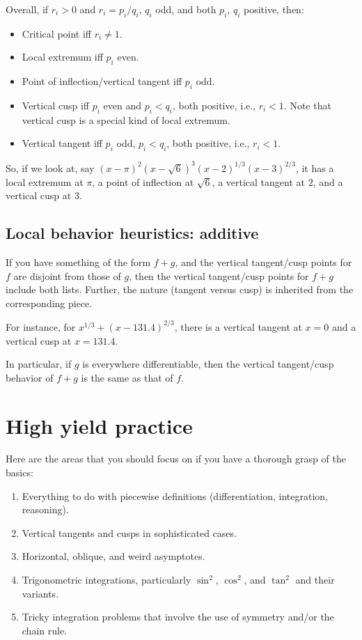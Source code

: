 \documentclass[10pt]{amsart}
\begin{document}
Overall, if $r_i > 0$ and $r_i = p_i/q_i$, $q_i$ odd, and both $p_i$,
$q_i$ positive, then:

\begin{itemize}
\item Critical point iff $r_i \ne 1$.
\item Local extremum iff $p_i$ even.
\item Point of inflection/vertical tangent iff $p_i$ odd.
\item Vertical cusp iff $p_i$ even and $p_i < q_i$, both positive,
  i.e., $r_i < 1$. Note that vertical cusp is a special kind of local extremum.
\item Vertical tangent iff $p_i$ odd, $p_i < q_i$, both positive,
i.e., $r_i < 1$.
\end{itemize}

So, if we look at, say $(x - \pi)^2(x - \sqrt{6})^3(x - 2)^{1/3}(x -
3)^{2/3}$, it has a local extremum at $\pi$, a point of inflection at
$\sqrt{6}$, a vertical tangent at $2$, and a vertical cusp at $3$.

\subsection{Local behavior heuristics: additive}

If you have something of the form $f + g$, and the vertical
tangent/cusp points for $f$ are disjoint from those of $g$, then the
vertical tangent/cusp points for $f + g$ include both lists. Further,
the nature (tangent versus cusp) is inherited from the corresponding
piece.

For instance, for $x^{1/3} + (x - 131.4)^{2/3}$, there is a vertical
tangent at $x = 0$ and a vertical cusp at $x = 131.4$.

In particular, if $g$ is everywhere differentiable, then the vertical
tangent/cusp behavior of $f + g$ is the same as that of $f$.

\section{High yield practice}

Here are the areas that you should focus on if you have a thorough grasp of the basics:

\begin{enumerate}
\item Everything to do with piecewise definitions (differentiation,
  integration, reasoning).
\item Vertical tangents and cusps in sophisticated cases.
\item Horizontal, oblique, and weird asymptotes.
\item Trigonometric integrations, particularly $\sin^2$, $\cos^2$, and
  $\tan^2$ and their variants.
\item Tricky integration problems that involve the use of symmetry
  and/or the chain rule.
\end{enumerate}
\end{document}
